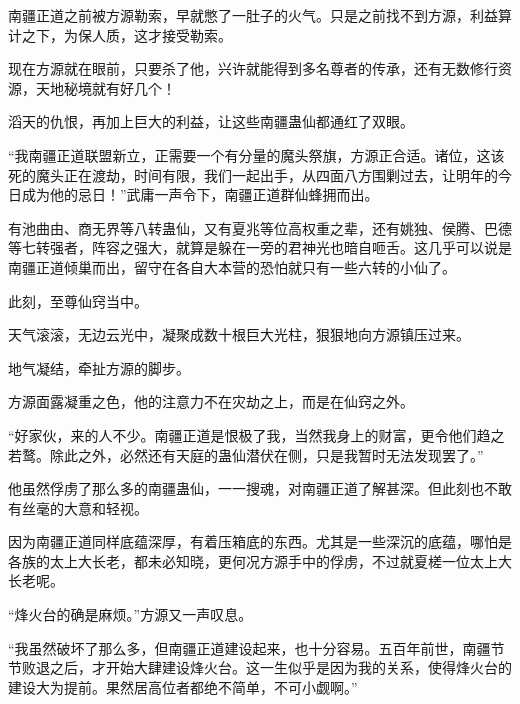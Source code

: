 \begin{this_body}
南疆正道之前被方源勒索，早就憋了一肚子的火气。只是之前找不到方源，利益算计之下，为保人质，这才接受勒索。

现在方源就在眼前，只要杀了他，兴许就能得到多名尊者的传承，还有无数修行资源，天地秘境就有好几个！

滔天的仇恨，再加上巨大的利益，让这些南疆蛊仙都通红了双眼。

“我南疆正道联盟新立，正需要一个有分量的魔头祭旗，方源正合适。诸位，这该死的魔头正在渡劫，时间有限，我们一起出手，从四面八方围剿过去，让明年的今日成为他的忌日！”武庸一声令下，南疆正道群仙蜂拥而出。

有池曲由、商无界等八转蛊仙，又有夏兆等位高权重之辈，还有姚独、侯腾、巴德等七转强者，阵容之强大，就算是躲在一旁的君神光也暗自咂舌。这几乎可以说是南疆正道倾巢而出，留守在各自大本营的恐怕就只有一些六转的小仙了。

此刻，至尊仙窍当中。

天气滚滚，无边云光中，凝聚成数十根巨大光柱，狠狠地向方源镇压过来。

地气凝结，牵扯方源的脚步。

方源面露凝重之色，他的注意力不在灾劫之上，而是在仙窍之外。

“好家伙，来的人不少。南疆正道是恨极了我，当然我身上的财富，更令他们趋之若鹜。除此之外，必然还有天庭的蛊仙潜伏在侧，只是我暂时无法发现罢了。”

他虽然俘虏了那么多的南疆蛊仙，一一搜魂，对南疆正道了解甚深。但此刻也不敢有丝毫的大意和轻视。

因为南疆正道同样底蕴深厚，有着压箱底的东西。尤其是一些深沉的底蕴，哪怕是各族的太上大长老，都未必知晓，更何况方源手中的俘虏，不过就夏槎一位太上大长老呢。

“烽火台的确是麻烦。”方源又一声叹息。

“我虽然破坏了那么多，但南疆正道建设起来，也十分容易。五百年前世，南疆节节败退之后，才开始大肆建设烽火台。这一生似乎是因为我的关系，使得烽火台的建设大为提前。果然居高位者都绝不简单，不可小觑啊。”

\end{this_body}

